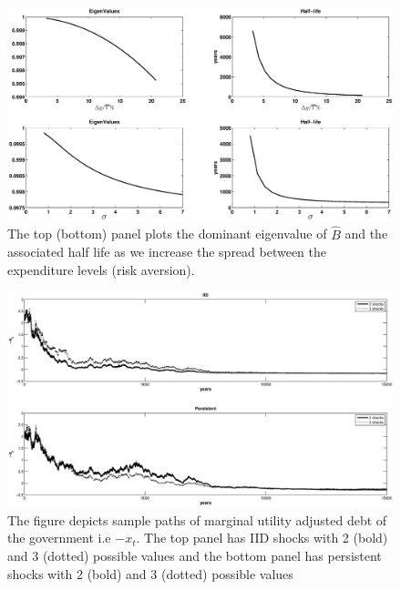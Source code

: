 \documentclass[thmsb,11pt]{article}
\begin{document}
  \begin{figure}[htp]
 \centering
 \includegraphics[width=\textwidth]{Draft25Graphs/eigenvalues.eps}
 \caption{The top (bottom) panel plots the dominant eigenvalue of $\hat{B}$ and the associated half life as we increase
the spread between the expenditure levels (risk aversion). }
 \label{fig: Eigenvalues}
 \end{figure}

\newpage

   \begin{figure}[htp]
  \centering
  \includegraphics[width=\textwidth]{Draft25Graphs/generalshocks_x.eps}
  \caption{The figure depicts sample paths of marginal utility adjusted debt of the government i.e  $-x_t$. The top panel has IID shocks with 2 (bold) and 3 (dotted) possible values and the bottom panel has persistent shocks with 2 (bold) and 3 (dotted) possible values}
 \label{fig:moregeneralshocks}
  \end{figure}

\newpage
\end{document}
